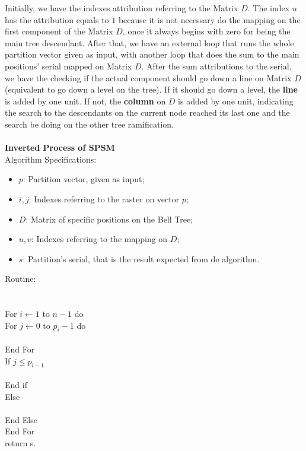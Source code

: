 \documentclass {amsart}
\begin{document}
Initially, we have the indexes attribution referring to the Matrix
{$D$}. The index {$u$} has the attribution equals to {$1$} because
it is not necessary do the mapping on the first component of the
Matrix {$D$}, once it always begins with zero for being the main
tree descendant. After that, we have an external loop that runs
the whole partition vector given as input, with another loop that
does the sum to the main positions' serial mapped on Matrix {$D$}.
After the sum attributions to the serial, we have the checking if
the actual component should go down a line on Matrix {$D$}
(equivalent to go down a level on the tree). If it should go down
a level, the \textbf{line} is added by one unit. If not, the
\textbf{column} on {$D$} is added by one unit, indicating the
search to the descendants on the current node reached its last one
and the search be doing on the other tree ramification.
\\\\
\textbf{Inverted Process of SPSM}\\
Algorithm Specifications:
\begin{itemize}
\item {$p$}: Partition vector, given as input;

\item {$i,j$}: Indexes referring to the raster on vector {$p$};

\item {$D$}: Matrix of specific positions on the Bell Tree;

\item {$u,v$}: Indexes referring to the mapping on {$D$};

\item {$s$}: Partition's serial, that is the result expected from
de algorithm.
\end{itemize}
Routine: \\
\\
\\
\indent For {$i \leftarrow 1$} to {$n-1$} do\\
\indent \indent For {$j \leftarrow 0$} to {$p_i - 1$} do\\
\indent \indent {}\\
\indent \indent End For\\
\indent \indent If {$j \leq p_{i-1}$}\\
\indent \indent {}\\
\indent \indent End if\\
\indent \indent Else\\
\indent \indent {}\\
\indent \indent End Else \\
\indent End For \\
return s.
\end{document}
